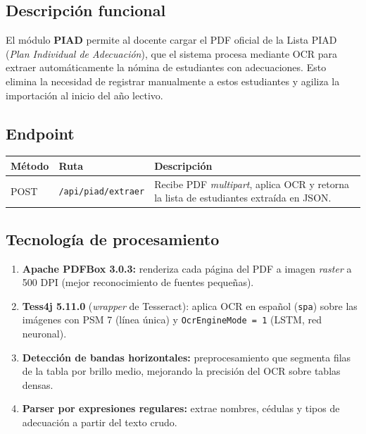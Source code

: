 \documentclass[11pt,a4paper,oneside]{article}
\newcommand{\code}[1]{\texttt{\small #1}}
\begin{document}
\subsection{Descripción funcional}

El módulo \textbf{PIAD} permite al docente cargar el PDF oficial de la Lista PIAD (\emph{Plan
Individual de Adecuación}), que el sistema procesa mediante OCR para extraer automáticamente
la nómina de estudiantes con adecuaciones. Esto elimina la necesidad de registrar manualmente
a estos estudiantes y agiliza la importación al inicio del año lectivo.

\subsection{Endpoint}

\begin{table}[h]
\centering\small\renewcommand{\arraystretch}{1.15}
\begin{tabular}{@{}p{1.4cm} p{4.5cm} p{8.5cm}@{}}
\toprule
\textbf{Método} & \textbf{Ruta} & \textbf{Descripción} \\
\midrule
POST & \code{/api/piad/extraer} & Recibe PDF \emph{multipart}, aplica OCR y retorna la lista
                                  de estudiantes extraída en JSON. \\
\bottomrule
\end{tabular}
\end{table}

\subsection{Tecnología de procesamiento}

\begin{enumerate}[leftmargin=*]
  \item \textbf{Apache PDFBox 3.0.3:} renderiza cada página del PDF a imagen \emph{raster}
        a 500 DPI (mejor reconocimiento de fuentes pequeñas).
  \item \textbf{Tess4j 5.11.0} (\emph{wrapper} de Tesseract): aplica OCR en español
        (\code{spa}) sobre las imágenes con PSM 7 (línea única) y \code{OcrEngineMode = 1}
        (LSTM, red neuronal).
  \item \textbf{Detección de bandas horizontales:} preprocesamiento que segmenta filas de la
        tabla por brillo medio, mejorando la precisión del OCR sobre tablas densas.
  \item \textbf{Parser por expresiones regulares:} extrae nombres, cédulas y tipos de
        adecuación a partir del texto crudo.
\end{enumerate}
\end{document}

